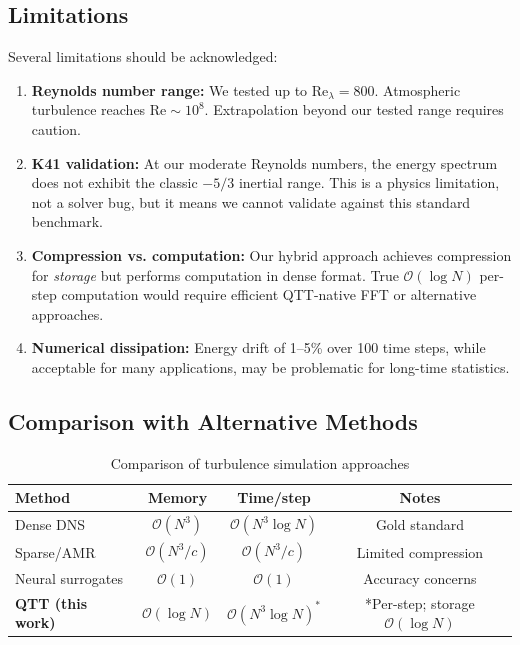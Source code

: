 \documentclass[11pt,a4paper]{article}
\newcommand{\bigO}{\mathcal{O}}
\theoremstyle{definition}
\begin{document}
\subsection{Limitations}

Several limitations should be acknowledged:

\begin{enumerate}
    \item \textbf{Reynolds number range:} We tested up to $\text{Re}_\lambda = 800$. Atmospheric turbulence reaches $\text{Re} \sim 10^8$. Extrapolation beyond our tested range requires caution.
    
    \item \textbf{K41 validation:} At our moderate Reynolds numbers, the energy spectrum does not exhibit the classic $-5/3$ inertial range. This is a physics limitation, not a solver bug, but it means we cannot validate against this standard benchmark.
    
    \item \textbf{Compression vs. computation:} Our hybrid approach achieves compression for \emph{storage} but performs computation in dense format. True $\bigO(\log N)$ per-step computation would require efficient QTT-native FFT or alternative approaches.
    
    \item \textbf{Numerical dissipation:} Energy drift of 1--5\% over 100 time steps, while acceptable for many applications, may be problematic for long-time statistics.
\end{enumerate}

\subsection{Comparison with Alternative Methods}

\begin{table}[htbp]
\centering
\caption{Comparison of turbulence simulation approaches}
\label{tab:comparison}
\begin{tabular}{lccc}
\toprule
Method & Memory & Time/step & Notes \\
\midrule
Dense DNS & $\bigO(N^3)$ & $\bigO(N^3 \log N)$ & Gold standard \\
Sparse/AMR & $\bigO(N^3/c)$ & $\bigO(N^3/c)$ & Limited compression \\
Neural surrogates & $\bigO(1)$ & $\bigO(1)$ & Accuracy concerns \\
\textbf{QTT (this work)} & $\bigO(\log N)$ & $\bigO(N^3 \log N)^*$ & *Per-step; storage $\bigO(\log N)$ \\
\bottomrule
\end{tabular}
\end{table}
\end{document}
